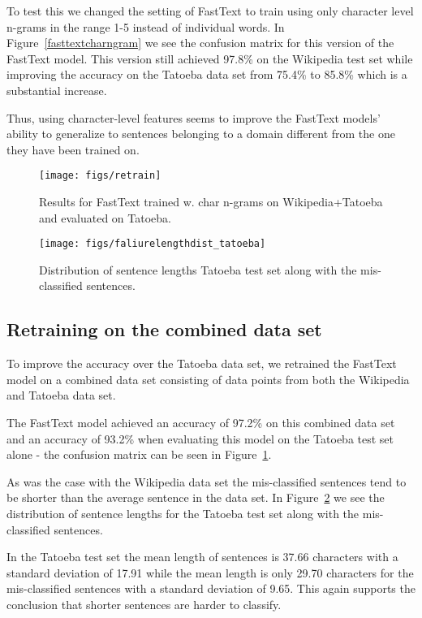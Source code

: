 \documentclass[11pt,a4paper]{article}
\begin{document}
To test this we changed the setting of FastText to train using only character level n-grams in the range 1-5 instead of individual words. In Figure~\ref{fasttextcharngram} we see the confusion matrix for this version of the FastText model. This version still achieved 97.8\% on the Wikipedia test set while improving the accuracy on the Tatoeba data set from 75.4\% to 85.8\% which is a substantial increase.

Thus, using character-level features seems to improve the FastText models' ability to generalize to sentences belonging to a domain different from the one they have been trained on.

\begin{figure}
  \centering
      \texttt{[image: figs/retrain]}
      \caption{Results for FastText trained w. char n-grams on Wikipedia+Tatoeba and evaluated on Tatoeba.}
      \label{retrain-confuss}
\end{figure}



\begin{figure}
\centering
        \texttt{[image: figs/faliurelengthdist\_tatoeba]}
        \caption{Distribution of sentence lengths Tatoeba test set along with the mis-classified sentences.}
        \label{retrain-lengths}
\end{figure}


\subsection{Retraining on the combined data set}
To improve the accuracy over the Tatoeba data set, we retrained the FastText model on a combined data set consisting of data points from
both the Wikipedia and Tatoeba data set.

The FastText model achieved an accuracy of 97.2\% on this combined data set and an accuracy of 93.2\% when evaluating this model on the Tatoeba test set alone - the confusion matrix can be seen in Figure~\ref{retrain-confuss}.

As was the case with the Wikipedia data set the mis-classified sentences tend to be shorter than the average sentence in the data set. In Figure~\ref{retrain-lengths} we see the distribution of sentence lengths for the Tatoeba test set along with the mis-classified sentences.

In the Tatoeba test set the mean length of sentences is 37.66 characters with a standard deviation of 17.91 while the mean length is only 29.70 characters for the mis-classified sentences with a standard deviation of 9.65. This again supports the conclusion that shorter sentences are harder to classify.
\end{document}
